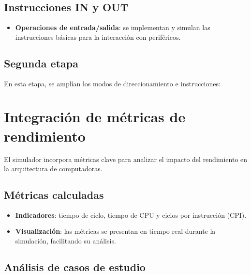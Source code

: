 \documentclass[12pt,oneside]{templates/unerthesis}
\providecommand{\tightlist}{%
  \setlength{\itemsep}{0pt}\setlength{\parskip}{0pt}}
\begin{document}
\hypertarget{instrucciones-in-y-out}{%
\subsection{Instrucciones IN y OUT}\label{instrucciones-in-y-out}}

\begin{itemize}
\tightlist
\item
  \textbf{Operaciones de entrada/salida}: se implementan y simulan las instrucciones básicas para la interacción con periféricos.
\end{itemize}

\hypertarget{segunda-etapa}{%
\subsection{Segunda etapa}\label{segunda-etapa}}

En esta etapa, se amplían los modos de direccionamiento e instrucciones:

\hypertarget{integraciuxf3n-de-muxe9tricas-de-rendimiento}{%
\section{Integración de métricas de rendimiento}\label{integraciuxf3n-de-muxe9tricas-de-rendimiento}}

El simulador incorpora métricas clave para analizar el impacto del rendimiento en la arquitectura de computadoras.

\hypertarget{muxe9tricas-calculadas}{%
\subsection{Métricas calculadas}\label{muxe9tricas-calculadas}}

\begin{itemize}
\tightlist
\item
  \textbf{Indicadores}: tiempo de ciclo, tiempo de CPU y ciclos por instrucción (CPI).
\item
  \textbf{Visualización}: las métricas se presentan en tiempo real durante la simulación, facilitando su análisis.
\end{itemize}

\hypertarget{anuxe1lisis-de-casos-de-estudio}{%
\subsection{Análisis de casos de estudio}\label{anuxe1lisis-de-casos-de-estudio}}
\end{document}
